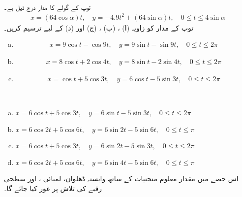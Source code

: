 \\
توپ کے  گولے کا مدار درج ذیل ہے۔
\begin{align*}
x=(64\cos \alpha)t,\quad y=-4.9t^2+(64\sin\alpha)t,\quad 0\le t\le 4\sin \alpha
\end{align*}
توپ کے مدار کو زاویہ (ا) ، (ب) ، (ج)  اور (د)   کے لیے ترسیم کریں۔
\\
\begin{enumerate}[a.]
\item
{}
\begin{align*}
x=9\cos t-\cos 9t,\quad y=9\sin t-\sin 9t,\quad 0\le t\le 2\pi
\end{align*}
\item
{}
\begin{align*}
x=8\cos t+2\cos 4t,\quad y=8\sin t-2\sin 4t,\quad 0\le t\le 2\pi
\end{align*}
\item
{}
\begin{align*}
x=\cos t+5\cos 3t,\quad y=6\cos t-5\sin 3t,\quad 0\le t\le 2\pi
\end{align*}
\end{enumerate}
\\
\begin{enumerate}[a.]
\item
$x=6\cos t+5\cos 3t,\quad y=6\sin t-5\sin 3t,\quad 0\le t\le 2\pi$
\item
$x=6\cos 2t+5\cos 6t,\quad y=6\sin 2t-5\sin 6t,\quad 0\le t\le \pi$
\item
$x=6\cos t+5\cos 3t,\quad y=6\sin 2t-5\sin 3t,\quad 0\le t\le 2\pi$
\item
$x=6\cos 2t+5\cos 6t,\quad y=6\sin 4t-5\sin 6t,\quad 0\le t\le \pi$
\end{enumerate}



اس حصے  میں مقدار معلوم منحنیات کے ساتھ وابستہ ڈھلوان، لمبائی ،  اور سطحی رقبے کی تلاش پر غور کیا جائے گا۔

